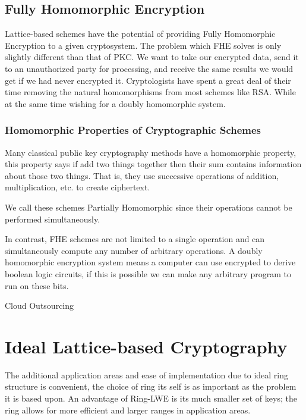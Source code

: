  
\subsection{Fully Homomorphic Encryption} 
Lattice-based schemes have the potential of providing Fully Homomorphic Encryption to a given cryptosystem. 
The problem which FHE solves is only slightly different than that of PKC. We want to take our encrypted data, send it to an unauthorized party for processing, 
and receive the same results we would get if we had never encrypted it.
\newline
Cryptologists have spent a great deal of their time removing the natural homomorphisms from most schemes like RSA. While at the same time wishing for a doubly homomorphic system. 

\newline

\subsubsection{Homomorphic Properties of Cryptographic Schemes} 
Many classical public key cryptography methods have a homomorphic property, this property says if add two things together then their sum contains information about those two things.
That is, they use successive operations of addition, multiplication, etc. to create ciphertext. 

We call these schemes Partially Homomorphic since their operations cannot be performed simultaneously. 


\newline
In contrast, FHE schemes are not limited to a single operation and can simultaneously compute any number of arbitrary operations. A doubly homomorphic encryption system means a computer can use encrypted to derive boolean logic circuits, if this is possible we can make any arbitrary program to run on these bits.


Cloud Outsourcing 


\section{Ideal Lattice-based Cryptography}
The additional application areas and ease of implementation due to ideal ring structure is convenient, the choice of ring its self is as important as the problem it is based upon. An advantage of Ring-LWE is its much smaller set of keys; the ring allows for more efficient and larger ranges in application areas. 

